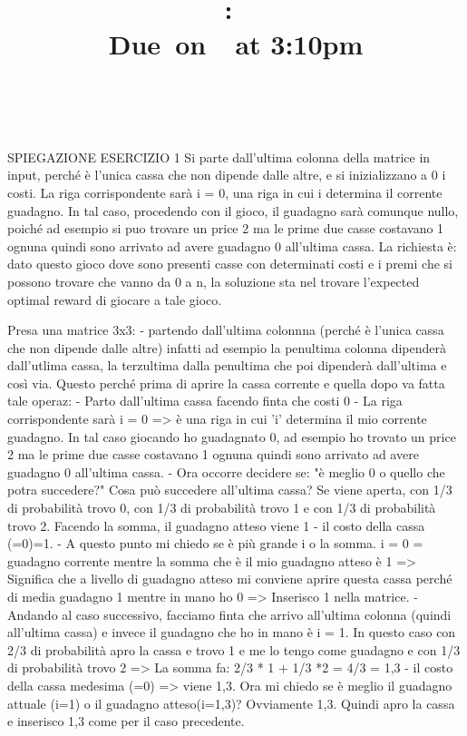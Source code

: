 \documentclass{article}
\title{
    \vspace{2in}
    \textmd{\textbf{\hmwkClass:\ \hmwkTitle}}\\
    \normalsize\vspace{0.1in}\small{Due\ on\ \hmwkDueDate\ at 3:10pm}\\
    \vspace{0.1in}\large{\textit{\hmwkClassInstructor\ \hmwkClassTime}}
    \vspace{3in}
}
\author{\hmwkAuthorName}
\date{}
\begin{document}
\maketitle

\pagebreak

\iffalse	SPIEGAZIONE ESERCIZIO 1
Si parte dall'ultima colonna della matrice in input, perché è l'unica cassa che non dipende dalle altre, e si inizializzano a 0 i costi.
La riga corrispondente sarà i = 0,  una riga in cui i determina il corrente guadagno. In tal caso, procedendo con il gioco, il guadagno sarà comunque nullo, poiché ad esempio si puo trovare 
un price 2 ma le prime due casse costavano 1 ognuna quindi sono arrivato
ad avere guadagno 0 all'ultima cassa.
La richiesta è: dato questo gioco dove sono presenti casse con determinati costi 
e i premi che si possono trovare che vanno da 0 a n, la soluzione sta nel trovare 
l'expected optimal reward di giocare a tale gioco.

Presa una matrice 3x3:
-   partendo dall'ultima colonnna (perché è l'unica cassa che non dipende dalle 
    altre) infatti ad esempio la penultima colonna dipenderà dall'utlima cassa,
    la terzultima dalla penultima che poi dipenderà dall'ultima e così via. Questo
    perché prima di aprire la cassa corrente e quella dopo va fatta tale operaz:
    -   Parto dall'ultima cassa facendo finta che costi 0
    -   La riga corrispondente sarà i = 0 => è una riga in cui 'i' determina il mio
        corrente guadagno. In tal caso giocando ho guadagnato 0, ad esempio ho trovato
        un price 2 ma le prime due casse costavano 1 ognuna quindi sono arrivato
        ad avere guadagno 0 all'ultima cassa.
    -   Ora occorre decidere se: "è meglio 0 o quello che potra succedere?"
        Cosa può succedere all'ultima cassa? Se viene aperta, con 1/3 di probabilità
        trovo 0, con 1/3 di probabilità trovo 1 e con 1/3 di probabilità trovo 2.
        Facendo la somma, il guadagno atteso viene 1 -  il costo della cassa (=0)=1.
    -   A questo punto mi chiedo se è più grande i o la somma. i = 0 = guadagno corrente
        mentre la somma che è il mio guadagno atteso è 1 => Significa che a livello di
        guadagno atteso mi conviene aprire questa cassa perché di media guadagno 1 mentre in mano
        ho 0 => Inserisco 1 nella matrice.
    -   Andando al caso successivo, facciamo finta che arrivo all'ultima colonna (quindi
        all'ultima cassa) e invece il guadagno che ho in mano è i = 1.
        In questo caso con 2/3 di probabilità apro la cassa e trovo 1 e me lo tengo
        come guadagno e con 1/3 di probabilità trovo 2
        => La somma fa: 2/3 * 1 + 1/3 *2 = 4/3 = 1,3 - il costo della cassa medesima (=0)
            => viene 1,3.
        Ora mi chiedo se è meglio il guadagno attuale (i=1) o il guadagno atteso(i=1,3)?
        Ovviamente 1,3. Quindi apro la cassa e inserisco 1,3 come per il caso precedente.
\end{document}
